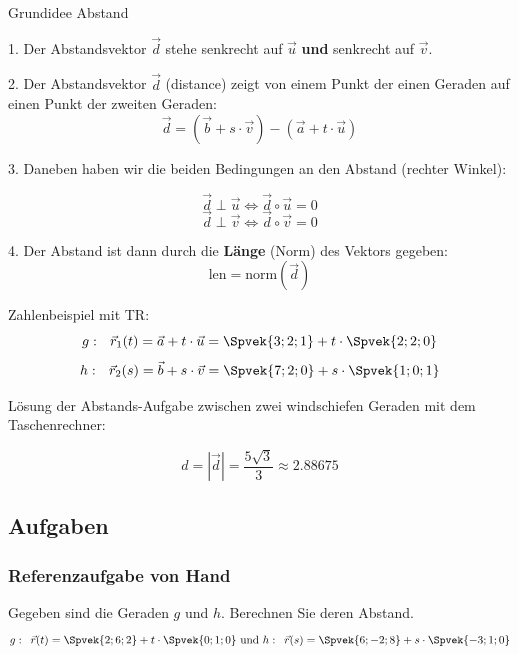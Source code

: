 \begin{rezept}{Grundidee Abstand}{}

  1. Der Abstandsvektor $\vec{d}$ stehe senkrecht auf $\vec{u}$
  \textbf{und} senkrecht auf $\vec{v}$.

  2. Der Abstandsvektor $\vec{d}$ (distance) zeigt von einem Punkt der einen Geraden auf
  einen Punkt der zweiten Geraden: $$\vec{d}=(\vec{b} + s\cdot{}\vec{v}) - (\vec{a} + t\cdot{}\vec{u})$$

  3. Daneben haben wir die beiden Bedingungen an den Abstand (rechter Winkel):

  $$\vec{d}\perp\vec{u} \Longleftrightarrow{}  \vec{d}\circ{}\vec{u} = 0$$
  $$\vec{d}\perp\vec{v} \Longleftrightarrow{}  \vec{d}\circ{}\vec{v} = 0$$

  4. Der Abstand ist dann durch die \textbf{Länge} (Norm) des Vektors gegeben:
  $$\text{len} = \text{norm}\left(\vec{d}\right)$$
  
\end{rezept}
\newpage

Zahlenbeispiel mit TR:
$$g:\,\,\,\, \vec{r}_1(t) =  \vec{a}+t\cdot{}\vec{u} = \Spvek{3;2;1} + t \cdot{} \Spvek{2;2;0}$$
$$h:\,\,\,\,  \vec{r}_2(s) = \vec{b}+s\cdot{}\vec{v} = \Spvek{7;2;0} + s \cdot{} \Spvek{1;0;1}$$

Lösung der Abstands-Aufgabe zwischen zwei windschiefen Geraden mit dem
Taschenrechner:
\TRAINER{}


$$d = |\vec{d} | = \frac{5\sqrt{3}}{3} \approx 2.88675$$

\subsection*{Aufgaben}
\newpage


\subsubsection*{Referenzaufgabe von Hand}

Gegeben sind die Geraden $g$ und $h$. Berechnen Sie deren Abstand.
$$g: \,\,\, \vec{r}(t) = \Spvek{2;6;2} + t\cdot{}\Spvek{0;1;0} \text{
  und }  h: \,\,\, \vec{r}(s) = \Spvek{6;-2;8} + s\cdot{}\Spvek{-3;1;0} $$

